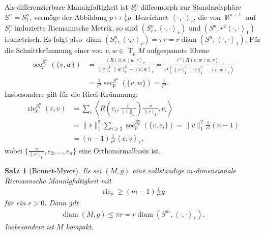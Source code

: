 \documentclass[paper=A4, twoside, chapterprefix=true, bibliography=totoc, headsepline]{scrbook}
\DeclareMathOperator{\R}{\mathbb{R}}
\DeclareMathOperator{\diam}{diam}   %
\DeclareMathOperator{\ric}{ric}     %
\DeclareMathOperator{\T}{T}         %
\theoremstyle{plain}
\newtheorem{Satz}[Dfn]{Satz}
\theoremstyle{nonumberplain}
\theoremstyle{empty}
\theoremstyle{break}
\begin{document}
Als differenzierbare Mannigfaltigkeit ist $S^n_r$ diffeomorph zur Standardsph\"are $S^n = S^n_1$, verm\"oge der Abbildung $p \mapsto \frac{1}{r}p$. Bezeichnet $\left<\cdot,\cdot\right>_r$, die von
$\R^{n+1}$ auf $S^n_r$ induzierte Riemannsche Metrik, so sind $(S^n_r,\left<\cdot,\cdot\right>_r)$ und $(S^n,r^2\left<\cdot,\cdot\right>_1)$ isometrisch.
Es folgt also $\diam(S^n_r,\left<\cdot,\cdot\right>_r) = \pi r = r \diam(S^n,\left<\cdot,\cdot\right>_1)$.
F\"ur die Schnittkr\"ummung einer von $v,w \in \T_pM$ aufgespannte Ebene
\begin{align*}
  \sec_p^{S^n_r}(\{v,w\}) & =
  \frac{\left<R(v,w)w,r\right>_r}{\|v\|_r^2\|w\|_r^2-\left<v,w\right>_r}
  =
  \frac{r^2\left<R(v,w)w,v\right>_1}{r^4(\|v\|_1^2\|w\|_1^2-\left<v,w\right>_1)}\\
  & = \frac{1}{r^2} \sec_p^{S^n}(\{v,w\}) = \frac{1}{r^2}.
\end{align*}
Insbesondere gilt f\"ur die Ricci-Kr\"ummung:
\begin{align*}
  \ric_p^{S_r^n}(v,v) & = \sum_i \left<R\left(e_i,\frac{v}{\|v\|_1}\right)\frac{v}{\|v\|_1},e_i\right>\\
  & = \|v\|_1^2\sum_{i \geq 2}\sec_p^{S^n_r}(\{v,e_i\}) = \|v\|_1^2 \frac{1}{r^2}(n-1)\\
  & = (n-1)\frac{1}{r^2}\left<v,v\right>_1.
\end{align*}
wobei $\{\frac{v}{\|v\|_1}, e_2, \ldots, e_n\}$ eine Orthonormalbasis ist.

\begin{Satz}[Bonnet-Myers]
  Es sei $(M,g)$ eine vollst\"andige $m$-dimensionale Riemannsche Mannigfaltigkeit mit 
  \begin{align*}
    \ric_p \geq (m-1) \frac{1}{r^2} g
  \end{align*}
  f\"ur ein $r > 0$.
  Dann gilt
  \begin{align*}
    \diam(M,g) \leq \pi r = r \diam(S^m,\left<\cdot,\cdot\right>_1).
  \end{align*}
  Insbesondere ist $M$ kompakt.
\end{Satz}
\end{document}
